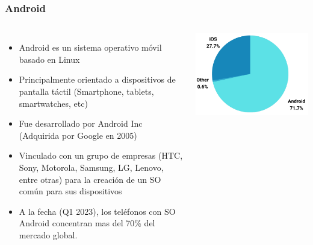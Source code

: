 \begin{frame}
\frametitle{Android} 
\begin{columns}
\begin{itemize}
\item Android es un sistema operativo móvil basado en Linux 
\item Principalmente orientado a dispositivos de pantalla t\'actil (Smartphone, tablets, smartwatches, etc)
\item Fue desarrollado por Android Inc (Adquirida por Google en 2005)
\item Vinculado con un grupo de empresas (HTC, Sony, Motorola, Samsung, LG, Lenovo, entre otras) para la creaci\'on de un SO com\'un para sus dispositivos
\item A la fecha (Q1 2023), los tel\'efonos con SO Android concentran mas del 70\% del mercado global. 
\end{itemize}
\begin{center}
\includegraphics[width=0.95\linewidth]{00_IntroProgramacionYMoviles/AndroidVSIOs_WorldWide.png} 
\end{center}
\end{columns}
 
\end{frame}





